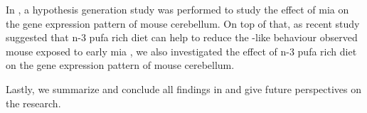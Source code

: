 	In , a hypothesis generation study was performed to study the effect of \gls{mia} on the gene expression pattern of mouse cerebellum. 
	On top of that, as recent study suggested that n-3 \gls{pufa} rich diet can help to reduce the -like behaviour observed mouse exposed to early \gls{mia} \citep{Li2015}, we also investigated the effect of n-3 \gls{pufa} rich diet on the gene expression pattern of mouse cerebellum.
	
	Lastly, we summarize and conclude all findings in  and give future perspectives on the  research.
	